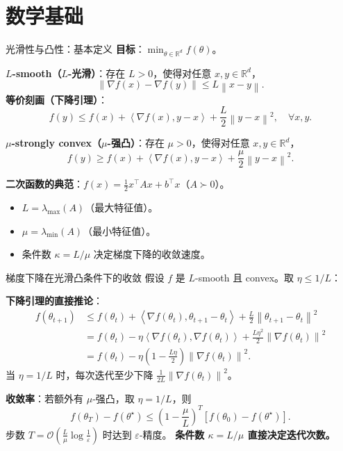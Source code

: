 \documentclass[aspectratio=169,10pt]{ctexbeamer}
\newcommand{\R}{\mathbb{R}}
\newcommand{\eps}{\varepsilon}
\newcommand{\grad}{\nabla}
\newcommand{\norm}[1]{\left\lVert #1 \right\rVert}
\newcommand{\ip}[2]{\left\langle #1,#2 \right\rangle}
\begin{document}
\section{数学基础}

\begin{frame}{光滑性与凸性：基本定义}
\textbf{目标}：$\min_{\theta\in\R^d}f(\theta)$。

\vspace{.2cm}
\textbf{$L$-smooth（$L$-光滑）}：存在 $L>0$，使得对任意 $x,y\in\R^d$，
\[
  \norm{\grad f(x)-\grad f(y)}\le L\norm{x-y}.
\]
\textbf{等价刻画（下降引理）}：
\[
  f(y)\le f(x)+\ip{\grad f(x)}{y-x}+\frac{L}{2}\norm{y-x}^2,\quad\forall x,y.
\]

\vspace{.2cm}
\textbf{$\mu$-strongly convex（$\mu$-强凸）}：存在 $\mu>0$，使得对任意 $x,y\in\R^d$，
\[
  f(y)\ge f(x)+\ip{\grad f(x)}{y-x}+\frac{\mu}{2}\norm{y-x}^2.
\]

\vspace{.2cm}
\textbf{二次函数的典范}：$f(x)=\frac12x^\top A x+b^\top x$（$A\succ0$）。
\begin{itemize}
  \item $L=\lambda_{\max}(A)$（最大特征值）。
  \item $\mu=\lambda_{\min}(A)$（最小特征值）。
  \item 条件数 $\kappa=L/\mu$ 决定梯度下降的收敛速度。
\end{itemize}
\end{frame}

\begin{frame}{梯度下降在光滑凸条件下的收敛}
假设 $f$ 是 $L$-smooth 且 convex。取 $\eta\le1/L$：

\vspace{.2cm}
\textbf{下降引理的直接推论}：
\[
  \begin{aligned}
  f(\theta_{t+1}) &\le f(\theta_t)+\ip{\grad f(\theta_t)}{\theta_{t+1}-\theta_t}
                   +\frac{L}{2}\norm{\theta_{t+1}-\theta_t}^2\\[3pt]
  &= f(\theta_t)-\eta\ip{\grad f(\theta_t)}{\grad f(\theta_t)}
     +\frac{L\eta^2}{2}\norm{\grad f(\theta_t)}^2\\[3pt]
  &= f(\theta_t)-\eta\left(1-\frac{L\eta}{2}\right)\norm{\grad f(\theta_t)}^2.
  \end{aligned}
\]
当 $\eta=1/L$ 时，每次迭代至少下降 $\frac{1}{2L}\norm{\grad f(\theta_t)}^2$。

\vspace{.2cm}
\textbf{收敛率}：若额外有 $\mu$-强凸，取 $\eta=1/L$，则
\[
  f(\theta_T)-f(\theta^\star)\le\left(1-\frac{\mu}{L}\right)^T[f(\theta_0)-f(\theta^\star)].
\]
步数 $T=\mathcal{O}\!\left(\frac{L}{\mu}\log\frac{1}{\eps}\right)$ 时达到 $\eps$-精度。
\textbf{条件数 $\kappa=L/\mu$ 直接决定迭代次数。}
\end{frame}
\end{document}
